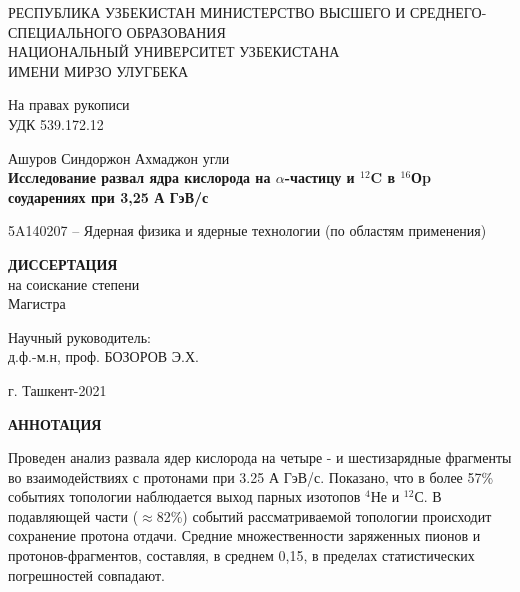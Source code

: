 \documentclass[fontsize=14pt]{scrreport}
\begin{document}
	\begin{titlepage}
		\begin{center}РЕСПУБЛИКА УЗБЕКИСТАН
 	МИНИСТЕРСТВО ВЫСШЕГО И СРЕДНЕГО-СПЕЦИАЛЬНОГО ОБРАЗОВАНИЯ \\ 
 	НАЦИОНАЛЬНЫЙ  УНИВЕРСИТЕТ УЗБЕКИСТАНА\\ИМЕНИ МИРЗО УЛУГБЕКА\\
	\begin{flushright}
			\small{На правах рукописи}\\
           \small{ УДК  539.172.12    }
			\end{flushright}
			\vfill

\textrm{Ашуров Синдоржон Ахмаджон угли}	\\		
			\large \textbf{Исследование развал ядра кислорода на $\alpha$-частицу и $^{12}$C в $^{16}$Оp соударениях при 3,25 А ГэВ/с }
			
		\end{center}
\begin{center}
5A140207 -- Ядерная физика и ядерные технологии (по областям применения)
\end{center}
         \vfill
         \begin{center}
         \textbf{ДИССЕРТАЦИЯ}\\
         на соискание степени\\
         Магистра
         \end{center}
         
         \begin{flushright}
Научный руководитель:\\
д.ф.-м.н, проф. БОЗОРОВ Э.Х.
         \end{flushright}
		\vfill
		\vfill
		\begin{center}
			г. Ташкент-2021
		\end{center}
	\end{titlepage}
	\newpage
	\renewcommand{\figurename}{Рисунок}
	\makenomenclature 
	\renewcommand{\nomname}{Список сокращений}
    \newcommand*{\nom}[2]{#1\nomenclature{#1}{#2}}
	\printnomenclature[5em]
	\newpage
	\renewcommand{\contentsname}{Содержание}
    \renewcommand{\chaptername}{Глава}
	\thispagestyle{plain}
\begin{center}
    \large
    \textbf{АННОТАЦИЯ}\\
    \vspace{0.4cm}

\end{center}
	\hspace{0.6cm}
   Проведен анализ развала ядер кислорода на четыре - и шестизарядные фрагменты во взаимодействиях с протонами при 3.25 А ГэВ/с. Показано, что в более 57\% событиях топологии  наблюдается выход парных изотопов $^{4}$Не и $^{12}$С. В подавляющей части ($\approx$82\%) событий рассматриваемой топологии происходит сохранение протона отдачи. Средние множественности заряженных пионов и протонов-фрагментов, составляя, в среднем 0,15, в пределах статистических погрешностей совпадают. 
 
\end{document}
